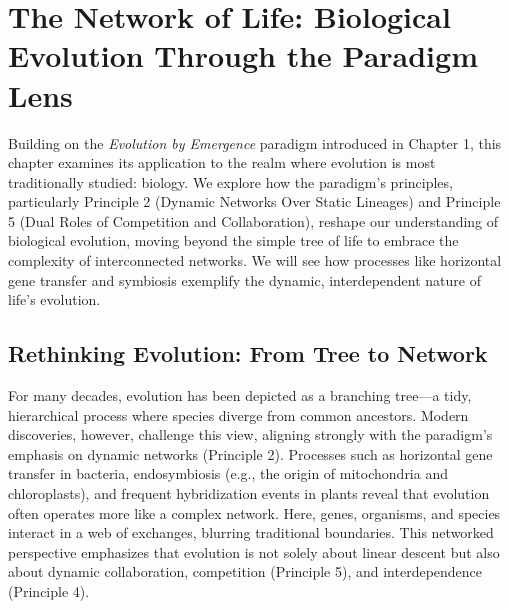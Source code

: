 \chapter{The Network of Life: Biological Evolution Through the Paradigm Lens} %
\label{ch:NetworkOfLife}

Building on the \emph{Evolution by Emergence} paradigm introduced in Chapter 1, this chapter examines its application to the realm where evolution is most traditionally studied: biology. We explore how the paradigm's principles, particularly Principle 2 (Dynamic Networks Over Static Lineages) and Principle 5 (Dual Roles of Competition and Collaboration), reshape our understanding of biological evolution, moving beyond the simple tree of life to embrace the complexity of interconnected networks. We will see how processes like horizontal gene transfer and symbiosis exemplify the dynamic, interdependent nature of life's evolution. %

\section{Rethinking Evolution: From Tree to Network}
For many decades, evolution has been depicted as a branching tree—a tidy, hierarchical process where species diverge from common ancestors. Modern discoveries, however, challenge this view, aligning strongly with the paradigm's emphasis on dynamic networks (Principle 2). Processes such as horizontal gene transfer in bacteria, endosymbiosis (e.g., the origin of mitochondria and chloroplasts), and frequent hybridization events in plants reveal that evolution often operates more like a complex network. Here, genes, organisms, and species interact in a web of exchanges, blurring traditional boundaries. This networked perspective emphasizes that evolution is not solely about linear descent but also about dynamic collaboration, competition (Principle 5), and interdependence (Principle 4). %

